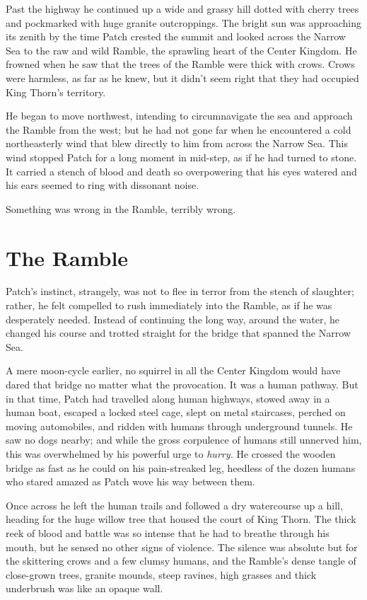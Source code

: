 \documentclass[12pt]{book}
\begin{document}
Past the highway he continued up a wide and grassy hill dotted with
cherry trees and pockmarked with huge granite outcroppings. The bright
sun was approaching its zenith by the time Patch crested the summit
and looked across the Narrow Sea to the raw and wild Ramble, the
sprawling heart of the Center Kingdom. He frowned when he saw that the
trees of the Ramble were thick with crows. Crows were harmless, as far
as he knew, but it didn't seem right that they had occupied King
Thorn's territory.

He began to move northwest, intending to circumnavigate the sea and
approach the Ramble from the west; but he had not gone far when he
encountered a cold northeasterly wind that blew directly to him from
across the Narrow Sea. This wind stopped Patch for a long moment in
mid-step, as if he had turned to stone. It carried a stench of blood
and death so overpowering that his eyes watered and his ears seemed to
ring with dissonant noise.

Something was wrong in the Ramble, terribly wrong.


\section{The Ramble}

Patch's instinct, strangely, was not to flee in terror from the stench
of slaughter; rather, he felt compelled to rush immediately into the
Ramble, as if he was desperately needed. Instead of continuing the
long way, around the water, he changed his course and trotted straight
for the bridge that spanned the Narrow Sea.

A mere moon-cycle earlier, no squirrel in all the Center Kingdom would
have dared that bridge no matter what the provocation. It was a human
pathway. But in that time, Patch had travelled along human highways,
stowed away in a human boat, escaped a locked steel cage, slept on
metal staircases, perched on moving automobiles, and ridden with
humans through underground tunnels. He saw no dogs nearby; and while
the gross corpulence of humans still unnerved him, this was
overwhelmed by his powerful urge to \textit{hurry.} He crossed the
wooden bridge as fast as he could on his pain-streaked leg, heedless
of the dozen humans who stared amazed as Patch wove his way between
them.

Once across he left the human trails and followed a dry watercourse up
a hill, heading for the huge willow tree that housed the court of King
Thorn. The thick reek of blood and battle was so intense that he had
to breathe through his mouth, but he sensed no other signs of
violence. The silence was absolute but for the skittering crows and a
few clumsy humans, and the Ramble's dense tangle of close-grown trees,
granite mounds, steep ravines, high grasses and thick underbrush was
like an opaque wall.
\end{document}
